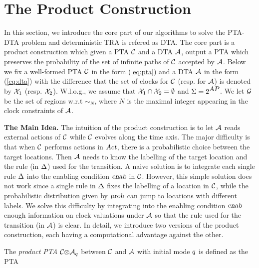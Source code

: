 \section{The Product Construction}
In this section, we introduce the core part of our algorithms to solve the {\sc PTA-DTA} problem
{\color{red} and deterministic TRA is refered as DTA.}
The core part is a product construction which given a PTA $\mathcal{C}$ and a DTA $\mathcal{A}$, output a PTA which preserves the probability of the set of infinite paths of $\mathcal{C}$ accepted by $\mathcal{A}$.
Below we fix a well-formed PTA $\mathcal{C}$ in the form (\ref{eq:pta}) and a DTA $\mathcal{A}$ in the form (\ref{eq:dta}) 
with the difference that the set of clocks for $\mathcal{C}$ (resp. for $\mathcal{A}$) is denoted by $\mathcal{X}_1$ (resp. $\mathcal{X}_2$).
W.l.o.g., we assume that $\mathcal{X}_1\cap\mathcal{X}_2=\emptyset$ and $\Sigma=2^{\mbox{\sl AP}}$.
We let $\mathcal{G}$ be the set of regions w.r.t $\sim_N$, where $N$ is the maximal integer appearing in the clock constraints of $\mathcal{A}$.

{\bf The Main Idea.} The intuition of the product construction is to let $\mathcal{A}$ reads external actions of $\mathcal{C}$ while $\mathcal{C}$ evolves along the time axis.
The major difficulty is that when $\mathcal{C}$ performs actions in $\mbox{\sl Act}$, there is a probabilistic choice between the target locations. Then $\mathcal{A}$ needs to know the labelling of the target location and the rule (in $\Delta$) used for the transition.
A naive solution is to integrate each single rule $\Delta$ into the enabling condition $\mbox{\sl enab}$ in $\mathcal{C}$. However, this simple solution does not work since a single rule in $\Delta$ fixes the labelling of a location in $\mathcal{C}$, while the probabilistic distribution given by $\mbox{\sl prob}$ can jump to locations with different labels.
We solve this difficulty by integrating into the enabling condition $\mbox{\sl enab}$ enough information on clock valuations under $\mathcal{A}$ so that the rule  used for the transition (in $\mathcal{A}$) is clear.
In detail, we introduce two versions of the product construction, each having a computational advantage against the other.

The \emph{product PTA} ${\mathcal{C}}{\otimes}{\mathcal{A}_q}$ between $\mathcal{C}$ and $\mathcal{A}$ with initial mode $q$ is defined as the PTA

